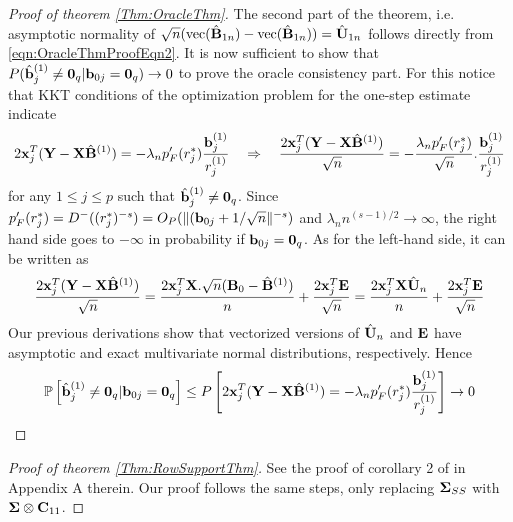 \begin{proof}[Proof of theorem \ref{Thm:OracleThm}]
The second part of the theorem, i.e. asymptotic normality of $\sqrt n (\operatorname*{\text{vec}} (\hat {{\mathbf{B}}}_{1n}) - \operatorname*{\text{vec}}(\hat{{\mathbf{B}}}_{1n})) = \hat{{\mathbf{U}}}_{1n}$ follows directly from \ref{eqn:OracleThmProofEqn2}. It is now sufficient to show that $P( \hat{{\bf{b}}}_j^{(1)} \neq {\bf 0}_q | {\bf{b}}_{0j} = {\bf 0}_q) \rightarrow 0$ to prove the oracle consistency part. For this notice that KKT conditions of the optimization problem for the one-step estimate indicate
%
\begin{equation}
2 {\bf{x}}_j^T ({\mathbf{Y}} - {\mathbf{X}} \hat{{\mathbf{B}}}^{(1)}) = - \lambda_n p'_F (r_j^*) \frac{{\bf{b}}_j^{(1)}}{r_j^{(1)}} \quad\Rightarrow\quad \frac{2 {\bf{x}}_j^T ({\mathbf{Y}} - {\mathbf{X}} \hat{{\mathbf{B}}}^{(1)})}{\sqrt n} = - \frac{\lambda_n p'_F (r_j^*)}{\sqrt n}. \frac{{\bf{b}}_j^{(1)}}{r_j^{(1)}}
\end{equation}
%
for any $1 \leq j \leq p$ such that $\hat{{\bf{b}}}_j^{(1)} \neq {\bf 0}_q$. Since $p'_F(r_j^*) = D^-( (r_j^*)^{-s}) = O_P ( \| ({\bf{b}}_{0j} + 1/\sqrt n \|^{-s})$ and $\lambda_n n^{(s-1)/2} \rightarrow \infty$, the right hand side goes to $-\infty$ in probability if ${\bf{b}}_{0j} = {\bf 0}_q$. As for the left-hand side, it can be written as
%
$$ \frac{2 {\bf{x}}_j^T ({\mathbf{Y}} - {\mathbf{X}} \hat{{\mathbf{B}}}^{(1)})}{\sqrt n} = \frac{2 {\bf{x}}_j^T {\mathbf{X}} .\sqrt n ({\mathbf{B}}_0 - \hat{{\mathbf{B}}}^{(1)})}{n} + \frac{2 {\bf{x}}_j^T {\mathbf{E}}}{\sqrt n} = \frac{2 {\bf{x}}_j^T {\mathbf{X}} \hat{{\mathbf{U}}}_n}{n} + \frac{2 {\bf{x}}_j^T {\mathbf{E}}}{\sqrt n}
$$
%
Our previous derivations show that vectorized versions of $\hat{{\mathbf{U}}}_n$ and ${\mathbf{E}}$ have asymptotic and exact multivariate normal distributions, respectively. Hence
%
$$
{\mathbb{P}} \left[ \hat{{\bf{b}}}_j^{(1)} \neq {\bf 0}_q | {\bf{b}}_{0j} = {\bf 0}_q \right] \leq P \left[ 2 {\bf{x}}_j^T ({\mathbf{Y}} - {\mathbf{X}} \hat{{\mathbf{B}}}^{(1)} ) = - \lambda_n p'_F (r_j^*) \frac{{\bf{b}}_j^{(1)}}{r_j^{(1)}} \right] \rightarrow 0
$$
\end{proof}

\begin{proof}[Proof of theorem \ref{Thm:RowSupportThm}]
See the proof of corollary 2 of \cite{ObozinskiEtal11}in Appendix A therein. Our proof follows the same steps, only replacing ${\boldsymbol{\Sigma}}_{SS}$ with ${\boldsymbol{\Sigma}} \otimes {\mathbf{C}}_{11}$.

\end{proof}

